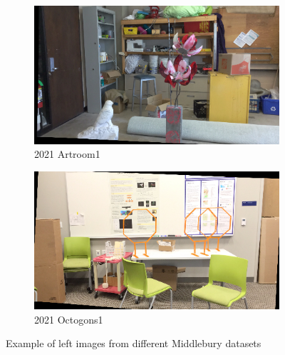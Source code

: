 \begin{figure}
\begin{subfigure}[t]{0.33\linewidth}
    \end{subfigure}\hfill
    \begin{subfigure}[t]{0.33\linewidth}
        \centering
        \includegraphics[width=\linewidth]{Images/Chap_5/2021_artroom1.png}
        \caption{2021 Artroom1}
        \label{fig:2021_artroom1}
    \end{subfigure}\hfill
    \begin{subfigure}[t]{0.33\linewidth}
        \centering
        \includegraphics[width=\linewidth]{Images/Chap_5/2021_octogons1.png}
        \caption{2021 Octogons1}
        \label{fig:2021_octogons1}
    \end{subfigure}
    \caption{Example of left images from  different Middlebury datasets}
    \label{fig:middlebury_examples}
\end{figure}

